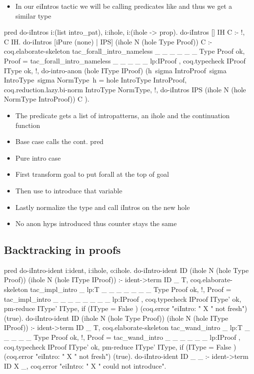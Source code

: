 \documentclass[thesis.tex]{subfiles}
\begin{document}
{\begin{itemize}
  \item In our eiIntros tactic we will be calling predicates like  and thus we get a similar type
\end{itemize}
\begin{elpicode}
  pred do-iIntros i:(list intro_pat), i:ihole, i:(ihole -> prop).
  do-iIntros [] IH C :- !, C IH.
  do-iIntros [iPure (none) | IPS] (ihole N (hole Type Proof)) C :-
    coq.elaborate-skeleton {{ tac_forall_intro_nameless _ _ _ _ _ _ }} Type Proof ok,
    Proof = {{ tac_forall_intro_nameless _ _ _ _ _ lp:IProof }},
    coq.typecheck IProof IType ok, !,
    do-intro-anon (hole IType IProof) (h\ sigma IntroProof\ sigma IntroType\ sigma NormType\
      h = hole IntroType IntroProof,
      coq.reduction.lazy.bi-norm IntroType NormType, !,
      do-iIntros IPS (ihole N (hole NormType IntroProof)) C
    ).
\end{elpicode}
\begin{itemize}
  \item The predicate  gets a list of intropatterns, an ihole and the continuation function
  \item Base case calls the cont. pred
  \item Pure intro case
  \item First transform goal to put forall at the top of goal
  \item Then use  to introduce that variable
  \item Lastly normalize the type and call iIntros on the new hole
  \item No anon \iris hyps introduced thus counter stays the same
\end{itemize}

\subsection{Backtracking in proofs}
\begin{elpicode}
  pred do-iIntro-ident i:ident, i:ihole, o:ihole.
  do-iIntro-ident ID (ihole N (hole Type Proof)) 
                     (ihole N (hole IType IProof)) :-
    ident->term ID _ T,
    coq.elaborate-skeleton 
      {{ tac_impl_intro _ lp:T _ _ _ _ _ _ _ }} 
      Type Proof ok, !,
    Proof = 
      {{ tac_impl_intro _ _ _ _ _ _ _ _ lp:IProof }},
    coq.typecheck IProof IType' ok,
    pm-reduce IType' IType,
    if (IType = {{ False }}) 
       (coq.error "eiIntro: " X " not fresh")
       (true).
  do-iIntro-ident ID (ihole N (hole Type Proof)) 
                     (ihole N (hole IType IProof)) :-
    ident->term ID _ T,
    coq.elaborate-skeleton 
      {{ tac_wand_intro _ lp:T _ _ _ _ _ }} 
      Type Proof ok, !,
    Proof = {{ tac_wand_intro _ _ _ _ _ _ lp:IProof }}, 
    coq.typecheck IProof IType' ok,
    pm-reduce IType' IType,
    if (IType = {{ False }}) 
       (coq.error "eiIntro: " X " not fresh") 
       (true).
  do-iIntro-ident ID _ _ :-
    ident->term ID X _,
    coq.error "eiIntro: " X " could not introduce".
\end{elpicode}

}
\end{document}
